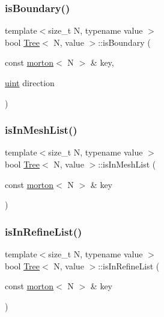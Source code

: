 \mbox{\label{classTree_a1fc56044946bc23f6c31c103c30d25fa}} 
\subsubsection{\texorpdfstring{is\+Boundary()}{isBoundary()}\hspace{0.1cm}{\footnotesize\ttfamily [2/2]}}
{\footnotesize\ttfamily template$<$size\+\_\+t N, typename value $>$ \\
bool \mbox{\hyperlink{classTree}{Tree}}$<$ N, value $>$\+::is\+Boundary (\begin{DoxyParamCaption}\item[{const \mbox{\hyperlink{definitions_8h_af8682350bd8bb38ee9023f7a0a310add}{morton}}$<$ N $>$ \&}]{key,  }\item[{\mbox{\hyperlink{definitions_8h_a69aa29b598b851b0640aa225a9e5d61d}{uint}}}]{direction }\end{DoxyParamCaption})}

\mbox{\label{classTree_af672673619621aa27e5e0c35dd3449d2}} 
\subsubsection{\texorpdfstring{is\+In\+Mesh\+List()}{isInMeshList()}}
{\footnotesize\ttfamily template$<$size\+\_\+t N, typename value $>$ \\
bool \mbox{\hyperlink{classTree}{Tree}}$<$ N, value $>$\+::is\+In\+Mesh\+List (\begin{DoxyParamCaption}\item[{const \mbox{\hyperlink{definitions_8h_af8682350bd8bb38ee9023f7a0a310add}{morton}}$<$ N $>$ \&}]{key }\end{DoxyParamCaption})}

\mbox{\label{classTree_a78d174e942a78fa20ac98db8c98ae6be}} 
\subsubsection{\texorpdfstring{is\+In\+Refine\+List()}{isInRefineList()}}
{\footnotesize\ttfamily template$<$size\+\_\+t N, typename value $>$ \\
bool \mbox{\hyperlink{classTree}{Tree}}$<$ N, value $>$\+::is\+In\+Refine\+List (\begin{DoxyParamCaption}\item[{const \mbox{\hyperlink{definitions_8h_af8682350bd8bb38ee9023f7a0a310add}{morton}}$<$ N $>$ \&}]{key }\end{DoxyParamCaption})}

